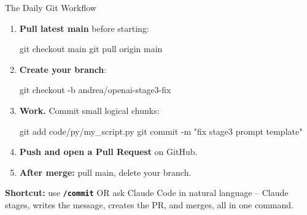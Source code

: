 \documentclass[aspectratio=169,11pt,dvipsnames]{beamer}
\newcommand{\skill}[1]{\texttt{\textcolor{defaultclr}{\textbf{/#1}}}}
\begin{document}
\begin{frame}[fragile]{The Daily Git Workflow}
\scriptsize
  \begin{enumerate}\setlength\itemsep{6pt}
    \item \textbf{Pull latest main} before starting:
      \begin{codebox}
git checkout main
git pull origin main
      \end{codebox}
    \item \textbf{Create your branch}:
      \begin{codebox}
git checkout -b andrea/openai-stage3-fix
      \end{codebox}
    \item \textbf{Work.} Commit small logical chunks:
      \begin{codebox}
git add code/py/my_script.py
git commit -m "fix stage3 prompt template"
      \end{codebox}
    \item \textbf{Push and open a Pull Request} on GitHub.
    \item \textbf{After merge:} pull main, delete your branch.
  \end{enumerate}
  \vspace{0.2cm}
  \begin{greenbox}
    \scriptsize \textbf{Shortcut:} use \skill{commit} OR ask Claude Code in natural language -- Claude stages, writes the message,
    creates the PR, and merges, all in one command.
  \end{greenbox}
\end{frame}
\end{document}

